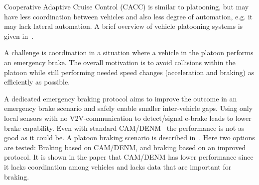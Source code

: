 Cooperative Adaptive Cruise Control (CACC) is similar to platooning, but may have less coordination between vehicles and also less degree of automation, e.g. it may lack lateral automation. A brief overview of vehicle platooning systems is given in~\cite{bergenhem2012}.

A challenge is coordination in a situation where a vehicle in the platoon performs an emergency brake. The overall motivation is to avoid collisions within the platoon while still performing needed speed changes (acceleration and braking) as efficiently as possible. 

A dedicated emergency braking protocol aims to improve the outcome in an emergency brake scenario and safely enable smaller inter-vehicle gaps. Using only local sensors with no V2V-communication to detect/signal e-brake leads to lower brake capability. Even with standard CAM/DENM~\cite{EN3026372,EN3026373} the performance is not as good as it could be. A platoon braking scenario is described in~\cite{bergenhem2015}. Here two options are tested: Braking based on CAM/DENM, and braking based on an improved protocol. It is shown in the paper that CAM/DENM has lower performance since it lacks coordination among vehicles and lacks data that are important for braking. %


